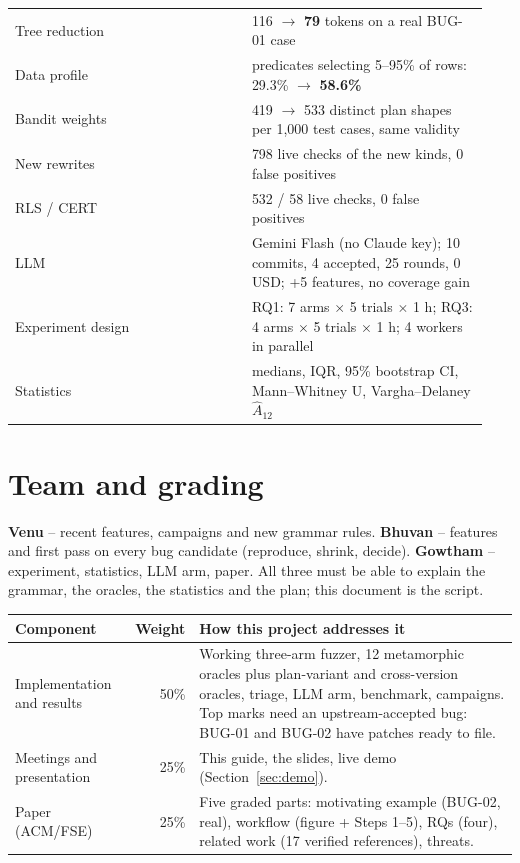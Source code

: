 \begin{longtable}{p{0.47\linewidth}p{0.47\linewidth}}
Tree reduction & 116 $\rightarrow$ \textbf{79} tokens on a real BUG-01 case \\
Data profile & predicates selecting 5--95\% of rows: 29.3\% $\rightarrow$ \textbf{58.6\%} \\
Bandit weights & 419 $\rightarrow$ 533 distinct plan shapes per 1{,}000 test cases, same validity \\
New rewrites & 798 live checks of the new kinds, 0 false positives \\
RLS / CERT & 532 / 58 live checks, 0 false positives \\
LLM & Gemini Flash (no Claude key); 10 commits, 4 accepted, 25 rounds, 0 USD; +5 features, no coverage gain \\
Experiment design & RQ1: 7 arms $\times$ 5 trials $\times$ 1 h; RQ3: 4 arms $\times$ 5 trials $\times$ 1 h; 4 workers in parallel \\
Statistics & medians, IQR, 95\% bootstrap CI, Mann--Whitney U, Vargha--Delaney $\hat A_{12}$ \\
\bottomrule
\end{longtable}

\section{Team and grading}

\textbf{Venu} -- recent \pg features, campaigns and new grammar rules.
\textbf{Bhuvan} -- features and first pass on every bug candidate (reproduce,
shrink, decide). \textbf{Gowtham} -- experiment, statistics, LLM arm, paper.
All three must be able to explain the grammar, the oracles, the statistics and
the plan; this document is the script.

\begin{tabularx}{\linewidth}{lrX}
\toprule
Component & Weight & How this project addresses it \\
\midrule
Implementation and results & 50\% & Working three-arm fuzzer, 12 metamorphic oracles plus plan-variant and cross-version oracles, triage, LLM arm, benchmark, campaigns. Top marks need an upstream-accepted bug: BUG-01 and BUG-02 have patches ready to file. \\
Meetings and presentation & 25\% & This guide, the slides, live demo (Section~\ref{sec:demo}). \\
Paper (ACM/FSE) & 25\% & Five graded parts: motivating example (BUG-02, real), workflow (figure + Steps 1--5), RQs (four), related work (17 verified references), threats. \\
\bottomrule
\end{tabularx}

